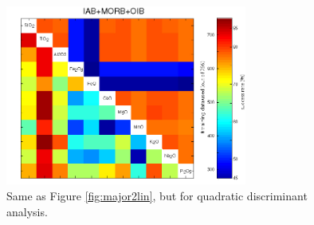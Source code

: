 \begin{figure}[htbp]
  \includegraphics[width=300]{figures/xPlotMajor2_quadratic_err.jpg}
  \caption[Same  as Figure  \ref{fig:major2lin}, but  for
quadratic discriminant analysis]  {Same as Figure \ref{fig:major2lin},
but for quadratic discriminant analysis.}
  \label{fig:major2quad}
\end{figure}

